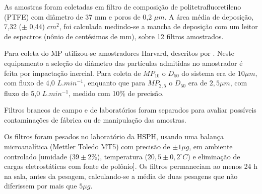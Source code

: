 %    

As amostras foram coletadas em filtro de composição de politetrafluoretileno
(PTFE) com diâmetro de 37 mm e 
poros de 0,2 $\mu m$. A área média de deposição, 7,32 ($\pm$ 0,44) $cm^2$, 
foi calculada medindo-se a mancha de deposição com um leitor de espectros 
(nônio de centésimos de mm), sobre 12 filtros amostrados.

Para coleta do MP utilizou-se amostradores Harvard, descritos por 
\citet{marple1987}. Neste equipamento a seleção do diâmetro das partículas 
admitidas no amostrador é feita por impactação inercial. 
Para coleta de $MP_{10}$ o $D_{50}$ do sistema era de $10 \mu m$, 
com fluxo de 4,0 $L.min^{-1}$, enquanto que para $MP_{2,5}$ o $D_{50}$ 
era de $2,5 \mu m$, com fluxo de 5,0 $L.min^{-1}$, medido com 10\% de precisão. 

Filtros brancos de campo e de laboratórios foram separados para avaliar 
possíveis contaminações de fábrica ou de manipulação das amostras. 

Os filtros foram pesados no laboratório da HSPH, usando uma balança
microanalítica (Mettler Toledo MT5) com precisão de $\pm 1 \mu g$, 
em ambiente controlado [umidade ($39 \pm 2 \%$), 
temperatura ($20,5 \pm 0,2 ^{\circ} C$) e eliminação de cargas eletrostáticas 
com fonte de polônio]. Os filtros permaneciam ao menos 24 h na sala, 
antes da pesagem, calculando-se a média de duas pesagens que não diferissem 
por mais que $5 \mu g$.
